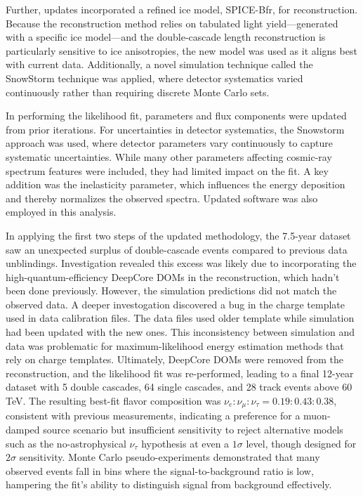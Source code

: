 Further, updates incorporated a refined ice model, SPICE-Bfr, for reconstruction. Because the reconstruction method relies on tabulated light yield—generated with a specific ice model—and the double-cascade length reconstruction is particularly sensitive to ice anisotropies, the new model was used as it aligns best with current data. Additionally, a novel simulation technique called the SnowStorm technique was applied, where detector systematics varied continuously rather than requiring discrete Monte Carlo sets.

In performing the likelihood fit, parameters and flux components were updated from prior iterations. For uncertainties in detector systematics, the Snowstorm approach was used, where detector parameters vary continuously to capture systematic uncertainties. While many other parameters affecting cosmic-ray spectrum features were included, they had limited impact on the fit. A key addition was the inelasticity parameter, which influences the energy deposition and thereby normalizes the observed spectra. Updated software was also employed in this analysis.

In applying the first two steps of the updated methodology, the 7.5-year dataset saw an unexpected surplus of double-cascade events compared to previous data unblindings. Investigation revealed this excess was likely due to incorporating the high-quantum-efficiency DeepCore DOMs in the reconstruction, which hadn’t been done previously. However, the simulation predictions did not match the observed data. A deeper investogation discovered a bug in the charge template used in data calibration files. The data files used older template while simulation had been updated with the new ones. This inconsistency between simulation and data was problematic for maximum-likelihood energy estimation methods that rely on charge templates. Ultimately, DeepCore DOMs were removed from the reconstruction, and the likelihood fit was re-performed, leading to a final 12-year dataset with 5 double cascades, 64 single cascades, and 28 track events above 60 TeV. The resulting best-fit flavor composition was $\nu_e : \nu_\mu : \nu_\tau=0.19:0.43:0.38$, consistent with previous measurements, indicating a preference for a muon-damped source scenario but insufficient sensitivity to reject alternative models such as the no-astrophysical $\nu_\tau$ hypothesis at even a $1\sigma$ level, though designed for $2\sigma$ sensitivity. Monte Carlo pseudo-experiments demonstrated that many observed events fall in bins where the signal-to-background ratio is low, hampering the fit’s ability to distinguish signal from background effectively.

